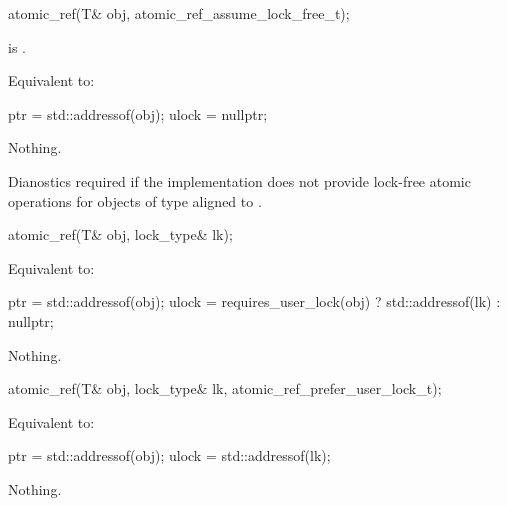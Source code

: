\begin{addedblock}
\begin{itemdecl}
atomic_ref(T& obj, atomic_ref_assume_lock_free_t);
\end{itemdecl}

\begin{itemdescr}
\pnum
\expects {} is .

\pnum
\effects Equivalent to:
\begin{codeblock}
  ptr = std::addressof(obj);
  ulock = nullptr;
\end{codeblock}

\pnum
\throws Nothing.

\pnum
\remarks Dianostics required if the implementation does not provide lock-free atomic
operations for objects of type  aligned to .

\end{itemdescr}
\end{addedblock}


\begin{addedblock}
\begin{itemdecl}
atomic_ref(T& obj, lock_type& lk);
\end{itemdecl}

\begin{itemdescr}

\pnum
\effects Equivalent to:
\begin{codeblock}
  ptr = std::addressof(obj);
  ulock = requires_user_lock(obj) ? std::addressof(lk) : nullptr;
\end{codeblock}

\pnum
\throws Nothing.

\end{itemdescr}
\end{addedblock}


\begin{addedblock}
\begin{itemdecl}
atomic_ref(T& obj, lock_type& lk, atomic_ref_prefer_user_lock_t);
\end{itemdecl}

\begin{itemdescr}

\pnum
\effects Equivalent to:
\begin{codeblock}
  ptr = std::addressof(obj);
  ulock = std::addressof(lk);
\end{codeblock}

\pnum
\throws Nothing.
\end{itemdescr}

\end{addedblock}


